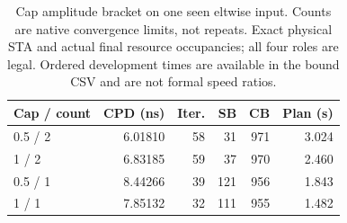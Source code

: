 \begin{table}[t]
\centering
\caption{Cap amplitude bracket on one seen eltwise input. Counts are native convergence limits, not repeats. Exact physical STA and actual final resource occupancies; all four roles are legal. Ordered development times are available in the bound CSV and are not formal speed ratios.}
\label{tab:cap-range}
\scriptsize
\begin{tabular}{lrrrrr}
\hline
Cap / count & CPD (ns) & Iter. & SB & CB & Plan (s) \\
\hline
0.5 / 2 & 6.01810 & 58 & 31 & 971 & 3.024 \\
1 / 2 & 6.83185 & 59 & 37 & 970 & 2.460 \\
0.5 / 1 & 8.44266 & 39 & 121 & 956 & 1.843 \\
1 / 1 & 7.85132 & 32 & 111 & 955 & 1.482 \\
\hline
\end{tabular}
\end{table}
